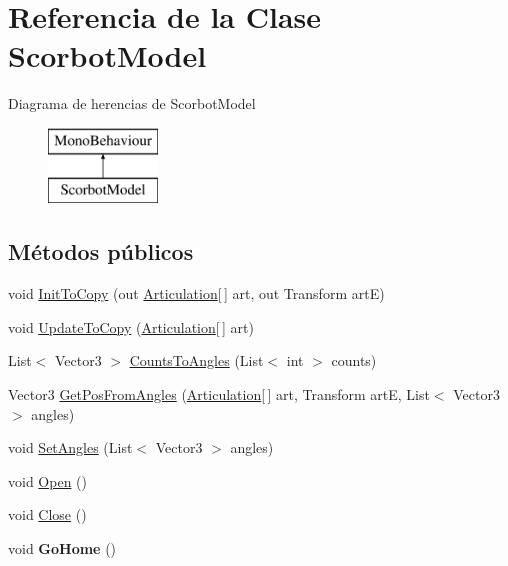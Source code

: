 \hypertarget{class_scorbot_model}{}\section{Referencia de la Clase Scorbot\+Model}
\label{class_scorbot_model}
Diagrama de herencias de Scorbot\+Model\begin{figure}[H]
\begin{center}
\leavevmode
\includegraphics[height=2.000000cm]{class_scorbot_model}
\end{center}
\end{figure}
\subsection*{Métodos públicos}
\begin{DoxyCompactItemize}
\item 
void \mbox{\hyperlink{class_scorbot_model_aba471bffb5190b184e14ce3598784d47}{Init\+To\+Copy}} (out \mbox{\hyperlink{class_articulation}{Articulation}}\mbox{[}$\,$\mbox{]} art, out Transform artE)
\item 
void \mbox{\hyperlink{class_scorbot_model_a78e73b1e1b2cda29a55529326ba2ca90}{Update\+To\+Copy}} (\mbox{\hyperlink{class_articulation}{Articulation}}\mbox{[}$\,$\mbox{]} art)
\item 
List$<$ Vector3 $>$ \mbox{\hyperlink{class_scorbot_model_a30c77a2653cea0ff41081d150b7e3bca}{Counts\+To\+Angles}} (List$<$ int $>$ counts)
\item 
Vector3 \mbox{\hyperlink{class_scorbot_model_ad09db01ea00a7f638ecbeabce57737cf}{Get\+Pos\+From\+Angles}} (\mbox{\hyperlink{class_articulation}{Articulation}}\mbox{[}$\,$\mbox{]} art, Transform artE, List$<$ Vector3 $>$ angles)
\item 
void \mbox{\hyperlink{class_scorbot_model_a74549ede37f30edafb1dbf07c0730cdd}{Set\+Angles}} (List$<$ Vector3 $>$ angles)
\item 
void \mbox{\hyperlink{class_scorbot_model_aaac42c1b3077127fcacfc463750ddd02}{Open}} ()
\item 
void \mbox{\hyperlink{class_scorbot_model_a2f4d3c10d7f8ce39bc2fce114efcc97f}{Close}} ()
\item 
\mbox{\label{class_scorbot_model_ac1a9d5941d2693308c5ee2fab4134a81}} 
void {\bfseries Go\+Home} ()
\end{DoxyCompactItemize}
